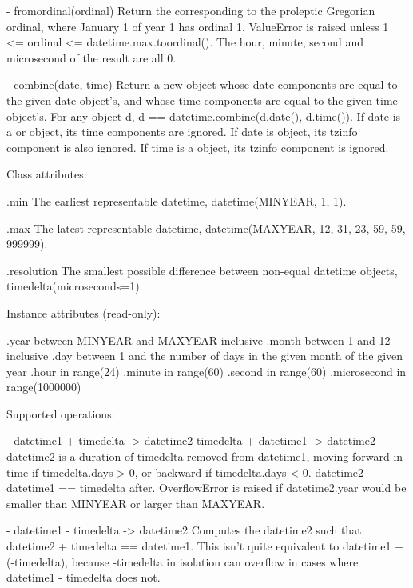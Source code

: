 {  - fromordinal(ordinal)
    Return the  corresponding to the proleptic Gregorian ordinal,
    where January 1 of year 1 has ordinal 1.  ValueError is raised
    unless 1 <= ordinal <= datetime.max.toordinal().  The hour, minute,
    second and microsecond of the result are all 0.

  - combine(date, time)
    Return a new  object whose date components are equal to the
    given date object's, and whose time components are equal to the given
    time object's.  For any  object d,
    d == datetime.combine(d.date(), d.time()).
    If date is a  or  object, its time components are
    ignored.  If date is  object, its tzinfo component is also
    ignored.  If time is a  object, its tzinfo component is ignored.

Class attributes:

    .min
        The earliest representable datetime,
        datetime(MINYEAR, 1, 1).

    .max
        The latest representable datetime,
        datetime(MAXYEAR, 12, 31, 23, 59, 59, 999999).

    .resolution
        The smallest possible difference between non-equal datetime
        objects, timedelta(microseconds=1).

Instance attributes (read-only):

    .year           between MINYEAR and MAXYEAR inclusive
    .month          between 1 and 12 inclusive
    .day            between 1 and the number of days in the given month
                    of the given year
    .hour           in range(24)
    .minute         in range(60)
    .second         in range(60)
    .microsecond    in range(1000000)

Supported operations:

    - datetime1 + timedelta -> datetime2
      timedelta + datetime1 -> datetime2
      datetime2 is a duration of timedelta removed from datetime1, moving
      forward in time if timedelta.days > 0, or backward if
      timedelta.days < 0.  datetime2 - datetime1 == timedelta after.
      OverflowError is raised if datetime2.year would be smaller than
      MINYEAR or larger than MAXYEAR.

    - datetime1 - timedelta -> datetime2
      Computes the datetime2 such that datetime2 + timedelta == datetime1.
      This isn't quite equivalent to datetime1 + (-timedelta), because
      -timedelta in isolation can overflow in cases where
      datetime1 - timedelta does not.

}
